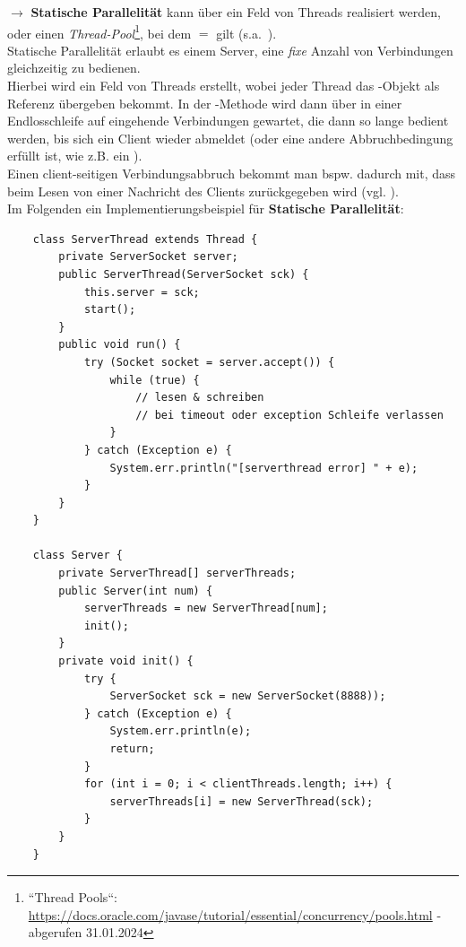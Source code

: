 $\rightarrow$ \textbf{Statische Parallelität} kann über ein Feld von Threads realisiert werden, oder einen \textit{Thread-Pool}\footnote{
``Thread Pools``: \url{https://docs.oracle.com/javase/tutorial/essential/concurrency/pools.html} - abgerufen 31.01.2024
}, bei dem  $=$  gilt (s.a.~\cite[146]{Oec22}).\\

\noindent
Statische Parallelität erlaubt es einem Server, eine \textit{fixe} Anzahl von Verbindungen gleichzeitig zu bedienen.\\
Hierbei wird ein Feld von Threads erstellt, wobei jeder Thread das -Objekt als Referenz übergeben bekommt.
In der -Methode wird dann über  in einer Endlosschleife auf eingehende Verbindungen gewartet, die dann so lange bedient werden, bis sich ein Client wieder abmeldet (oder eine andere Abbruchbedingung erfüllt ist, wie z.B. ein ).\\
Einen client-seitigen Verbindungsabbruch bekommt man {bspw.} dadurch mit, dass  beim Lesen von einer Nachricht des Clients zurückgegeben wird (vgl. \cite[286]{Oec22}).\\

\noindent
Im Folgenden ein Implementierungsbeispiel für \textbf{Statische Parallelität}:
\begin{verbatim}
    class ServerThread extends Thread {
        private ServerSocket server;
        public ServerThread(ServerSocket sck) {
            this.server = sck;
            start();
        }
        public void run() {
            try (Socket socket = server.accept()) {
                while (true) {
                    // lesen & schreiben
                    // bei timeout oder exception Schleife verlassen
                }
            } catch (Exception e) {
                System.err.println("[serverthread error] " + e);
            }
        }
    }

    class Server {
        private ServerThread[] serverThreads;
        public Server(int num) {
            serverThreads = new ServerThread[num];
            init();
        }
        private void init() {
            try {
                ServerSocket sck = new ServerSocket(8888));
            } catch (Exception e) {
                System.err.println(e);
                return;
            }
            for (int i = 0; i < clientThreads.length; i++) {
                serverThreads[i] = new ServerThread(sck);
            }
        }
    }
\end{verbatim}

